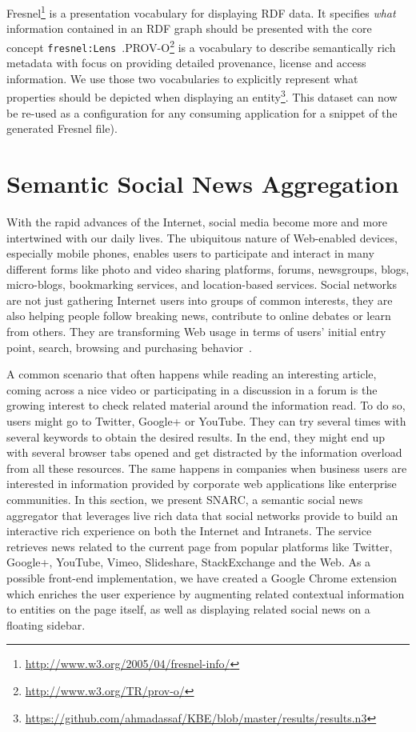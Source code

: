 \documentclass[a4paper,11pt,twoside]{ThesisStyle}
\begin{document}
Fresnel\footnote{\url{http://www.w3.org/2005/04/fresnel-info/}} is a presentation vocabulary for displaying RDF data. It specifies \textit{what} information contained in an RDF graph should be presented with the core concept \texttt{fresnel:Lens}~\cite{Pietriga:ISWC:06}.PROV-O\footnote{\url{http://www.w3.org/TR/prov-o/}} is a vocabulary to describe semantically rich metadata with focus on providing detailed provenance, license and access information.  We use those two vocabularies to explicitly represent what properties should be depicted when displaying an entity\footnote{\url{https://github.com/ahmadassaf/KBE/blob/master/results/results.n3}}. This dataset can now be re-used as a configuration for any consuming application for a snippet of the generated Fresnel file).


\section{Semantic Social News Aggregation}\label{chapter:snarc}

With the rapid advances of the Internet, social media become more and more intertwined with our daily lives. The ubiquitous nature of Web-enabled devices, especially mobile phones, enables users to participate and interact in many different forms like photo and video sharing platforms, forums, newsgroups, blogs, micro-blogs, bookmarking services, and location-based services. Social networks are not just gathering Internet users into groups of common interests, they are also helping people follow breaking news, contribute to online debates or learn from others. They are transforming Web usage in terms of users' initial entry point, search, browsing and purchasing behavior~\cite{Bakshy:WWW:12}.

A common scenario that often happens while reading an interesting article, coming across a nice video or participating in a discussion in a forum is the growing interest to check related material around the information read. To do so, users might go to Twitter, Google+ or YouTube. They can try several times with several keywords to obtain the desired results. In the end, they might end up with several browser tabs opened and get distracted by the information overload from all these resources. The same happens in companies when business users are interested in information provided by corporate web applications like enterprise communities. In this section, we present SNARC, a semantic social news aggregator that leverages live rich data that social networks provide to build an interactive rich experience on both the Internet and Intranets. The service retrieves news related to the current page from popular platforms like Twitter, Google+, YouTube, Vimeo, Slideshare, StackExchange and the Web. As a possible front-end implementation, we have created a Google Chrome extension which enriches the user experience by augmenting related contextual information to entities on the page itself, as well as displaying related social news on a floating sidebar.
\end{document}
